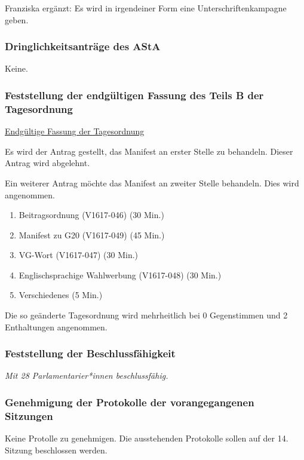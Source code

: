 \documentclass[ngerman,headheight=70pt]{scrartcl}
\begin{document}
    Franziska ergänzt:
    Es wird in irgendeiner Form eine Unterschriftenkampagne geben.

    \subsubsection{Dringlichkeitsanträge des AStA}

    Keine.

    \newpage
    \subsubsection{Feststellung der endgültigen Fassung des Teils B der Tagesordnung}

    \underline{Endgültige Fassung der Tagesordnung}

    Es wird der Antrag gestellt, das Manifest an erster Stelle zu behandeln.
    Dieser Antrag wird abgelehnt.

    Ein weiterer Antrag möchte das Manifest an zweiter Stelle behandeln. Dies
    wird angenommen.
    \begin{enumerate}[label={\textbf{Top \theenumi}},leftmargin=*]
        \item Beitragsordnung (V1617-046) (30 Min.)
        \item Manifest zu G20 (V1617-049) (45 Min.)
        \item VG-Wort (V1617-047) (30 Min.)
        \item Englischsprachige Wahlwerbung (V1617-048) (30 Min.)
        \item Verschiedenes (5 Min.)
    \end{enumerate}

    Die so geänderte Tagesordnung wird mehrheitlich bei 0 Gegenstimmen und 2
    Enthaltungen angenommen.

    \subsubsection{Feststellung der Beschlussfähigkeit}

    \textit{Mit 28 Parlamentarier*innen beschlussfähig.}

    \subsubsection{Genehmigung der Protokolle der vorangegangenen Sitzungen}

    Keine Protolle zu genehmigen. Die ausstehenden Protokolle sollen auf der
    14. Sitzung beschlossen werden.
\end{document}

